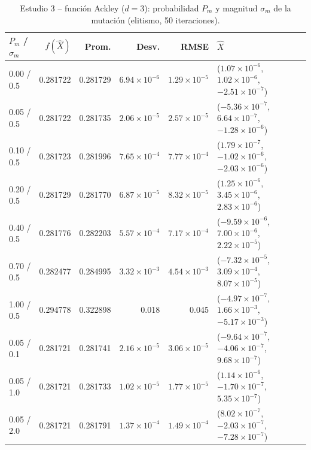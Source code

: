 \begin{table}[!t]
\centering
\scriptsize
\setlength{\tabcolsep}{2.5pt}
\caption{Estudio 3 -- funci\'on Ackley ($d=3$): probabilidad $P_m$ y magnitud $\sigma_m$ de la mutaci\'on (elitismo, 50 iteraciones).}
\label{tab:t3a}
\begin{tabular}{lrrrrl}
\hline
$P_m$ / $\sigma_m$ & $f(\hat{X})$ & Prom. & Desv. & RMSE & $\hat{X}$ \\
\hline
0.00 / 0.5 & 0.281722 & 0.281729 & $6.94{\times}10^{-6}$ & $1.29{\times}10^{-5}$ & ($1.07{\times}10^{-6}$, $1.02{\times}10^{-6}$, $-2.51{\times}10^{-7}$) \\
0.05 / 0.5 & 0.281722 & 0.281735 & $2.06{\times}10^{-5}$ & $2.57{\times}10^{-5}$ & ($-5.36{\times}10^{-7}$, $6.64{\times}10^{-7}$, $-1.28{\times}10^{-6}$) \\
0.10 / 0.5 & 0.281723 & 0.281996 & $7.65{\times}10^{-4}$ & $7.77{\times}10^{-4}$ & ($1.79{\times}10^{-7}$, $-1.02{\times}10^{-6}$, $-2.03{\times}10^{-6}$) \\
0.20 / 0.5 & 0.281729 & 0.281770 & $6.87{\times}10^{-5}$ & $8.32{\times}10^{-5}$ & ($1.25{\times}10^{-6}$, $3.45{\times}10^{-6}$, $2.83{\times}10^{-6}$) \\
0.40 / 0.5 & 0.281776 & 0.282203 & $5.57{\times}10^{-4}$ & $7.17{\times}10^{-4}$ & ($-9.59{\times}10^{-6}$, $7.00{\times}10^{-6}$, $2.22{\times}10^{-5}$) \\
0.70 / 0.5 & 0.282477 & 0.284995 & $3.32{\times}10^{-3}$ & $4.54{\times}10^{-3}$ & ($-7.32{\times}10^{-5}$, $3.09{\times}10^{-4}$, $8.07{\times}10^{-5}$) \\
1.00 / 0.5 & 0.294778 & 0.322898 & 0.018 & 0.045 & ($-4.97{\times}10^{-7}$, $1.66{\times}10^{-3}$, $-5.17{\times}10^{-3}$) \\
0.05 / 0.1 & 0.281721 & 0.281741 & $2.16{\times}10^{-5}$ & $3.06{\times}10^{-5}$ & ($-9.64{\times}10^{-7}$, $-4.06{\times}10^{-7}$, $9.68{\times}10^{-7}$) \\
0.05 / 1.0 & 0.281721 & 0.281733 & $1.02{\times}10^{-5}$ & $1.77{\times}10^{-5}$ & ($1.14{\times}10^{-6}$, $-1.70{\times}10^{-7}$, $5.35{\times}10^{-7}$) \\
0.05 / 2.0 & 0.281721 & 0.281791 & $1.37{\times}10^{-4}$ & $1.49{\times}10^{-4}$ & ($8.02{\times}10^{-7}$, $-2.03{\times}10^{-7}$, $-7.28{\times}10^{-7}$) \\
\hline
\end{tabular}
\end{table}
